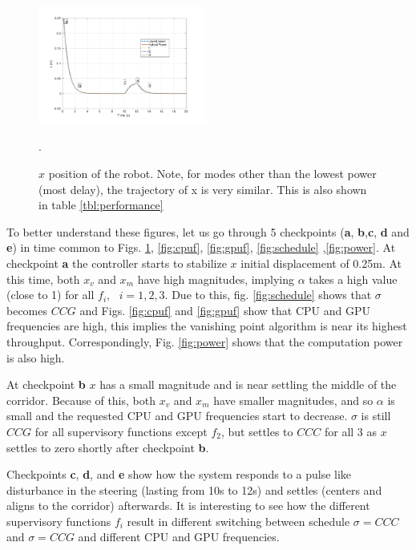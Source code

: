 \begin{figure}[t]
\centering
\includegraphics[width=0.49\textwidth]{../simulations/figs/xvst.pdf}
\vspace{-20pt}
\caption{$x$ position of the robot. Note, for modes other than the lowest power (most delay), the trajectory of x is very similar. This is also shown in table \ref{tbl:performance}}.
\label{fig:xvst} 
\end{figure}



To better understand these figures, let us go through 5 checkpoints (\textbf{a}, \textbf{b},\textbf{c}, \textbf{d} and \textbf{e}) in time common to Figs. \ref{fig:xvst}, \ref{fig:cpuf}, \ref{fig:gpuf}, \ref{fig:schedule} ,\ref{fig:power}.
At checkpoint \textbf{a} the controller starts to stabilize $x$ initial displacement of 0.25m. At this time, both $x_v$ and $x_m$ have high magnitudes, implying $\alpha$ takes a high value (close to 1) for all $f_i,\text{ }i=1,2,3$. Due to this, fig. \ref{fig:schedule} shows that $\sigma$ becomes $CCG$ and Figs. \ref{fig:cpuf} and \ref{fig:gpuf} show that CPU and GPU frequencies are high, this implies the vanishing point algorithm is near its highest throughput. Correspondingly, Fig. \ref{fig:power} shows that the computation power is also high.

At checkpoint \textbf{b} $x$ has a small magnitude and is near settling the middle of the corridor. Because of this, both $x_v$ and $x_m$ have smaller magnitudes, and so $\alpha$ is small and the requested CPU and GPU frequencies start to decrease. $\sigma$ is still $CCG$ for all supervisory functions except $f_2$, but settles to $CCC$ for all 3 as $x$ settles to zero shortly after checkpoint \textbf{b}.

Checkpoints \textbf{c}, \textbf{d}, and \textbf{e} show how the system responds to a pulse like disturbance in the steering (lasting from 10s to 12s) and settles (centers and aligns to the corridor) afterwards. It is interesting to see how the different supervisory functions $f_i$ result in different switching between schedule $\sigma=CCC$ and $\sigma=CCG$ and different CPU and GPU frequencies.

